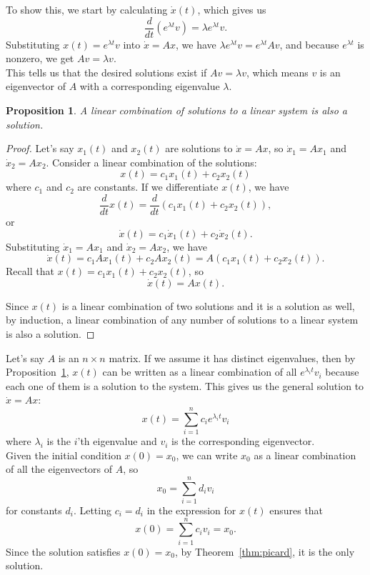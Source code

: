 \documentclass[12pt]{article}
\newtheorem{proposition}{Proposition}[section]
\newcommand{\dx}{\dot{x}}
\begin{document}
To show this, we start by calculating $\dx(t)$, which gives us
$$\frac{d}{dt}(e^{\lambda t}v) = \lambda e^{\lambda t}v.$$
Substituting $x(t) = e^{\lambda t}v$ into $\dx = Ax$, we have $\lambda e^{\lambda t}v = e^{\lambda t}Av$, and because $e^{\lambda t}$ is nonzero, we get $Av = \lambda v$. \\

This tells us that the desired solutions exist if $Av = \lambda v$, which means $v$ is an eigenvector of $A$ with a corresponding eigenvalue $\lambda$. \\

\begin{proposition}
\label{prop:linearcomb} A linear combination of solutions to a linear system is also a solution.
\end{proposition}

\renewcommand\qedsymbol{$\blacksquare$}
\begin{proof}
Let's say $x_1(t)$ and $x_2(t)$ are solutions to $\dx = Ax$, so $\dx_1 = Ax_1$ and $\dx_2 = Ax_2$. Consider a linear combination of the solutions:
$$x(t) = c_1x_1(t) + c_2x_2(t)$$
where $c_1$ and $c_2$ are constants. If we differentiate $x(t)$, we have
$$\frac{d}{dt}x(t) = \frac{d}{dt}(c_1x_1(t) + c_2x_2(t)),$$
or
$$\dx(t) = c_1\dx_1(t) + c_2\dx_2(t).$$
Substituting $\dx_1 = Ax_1$ and $\dx_2 = Ax_2$, we have
$$\dx(t) = c_1Ax_1(t) + c_2Ax_2(t) = A(c_1x_1(t) + c_2x_2(t)).$$
Recall that $x(t) = c_1x_1(t) + c_2x_2(t)$, so $$\dx(t) = Ax(t).$$

Since $x(t)$ is a linear combination of two solutions and it is a solution as well, by induction, a linear combination of any number of solutions to a linear system is also a solution.
\end{proof}

Let's say $A$ is an $n\times n$ matrix. If we assume it has distinct eigenvalues, then by Proposition~\ref{prop:linearcomb}, $x(t)$ can be written as a linear combination of all $e^{\lambda_i t}v_i$ because each one of them is a solution to the system. This gives us the general solution to $\dx = Ax$:
$$x(t) = \sum_{i = 1}^n c_i e^{\lambda_i t}v_i$$
where $\lambda_i$ is the $i$'th eigenvalue and $v_i$ is the corresponding eigenvector. \\

Given the initial condition $x(0) = x_0$, we can write $x_0$ as a linear combination of all the eigenvectors of $A$, so
$$x_0 = \sum_{i = 1}^n d_iv_i$$
for constants $d_i$. Letting $c_i = d_i$ in the expression for $x(t)$ ensures that
$$x(0) = \sum_{i = 1}^n c_iv_i = x_0.$$
Since the solution satisfies $x(0) = x_0$, by Theorem~\ref{thm:picard}, it is the only solution.
\end{document}
